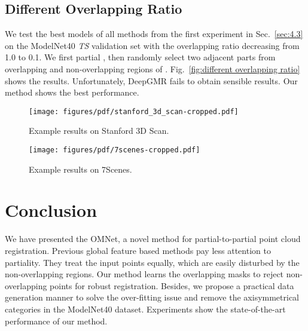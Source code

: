 \documentclass[10pt,twocolumn,letterpaper]{article}
\begin{document}
\subsection{Different Overlapping Ratio}
We test the best models of all methods from the first experiment in Sec.~\ref{sec:4.3} on the ModelNet40 \emph{TS} validation set with the overlapping ratio decreasing from 1.0 to 0.1. We first partial , then randomly select two adjacent parts from overlapping and non-overlapping regions of . Fig.~\ref{fig:different overlapping ratio} shows the results. Unfortunately, DeepGMR fails to obtain sensible results. Our method shows the best performance.

\begin{figure}[t]
    \centering
    \texttt{[image: figures/pdf/stanford\_3d\_scan-cropped.pdf]}\\
    \caption{Example results on Stanford 3D Scan.}
    \vspace{-0.35cm}
    \label{fig:stanford 3d scan}
\end{figure} \begin{figure}[t]
    \centering
    \texttt{[image: figures/pdf/7scenes-cropped.pdf]}\\
    \caption{Example results on 7Scenes.}
    \vspace{-0.40cm}
    \label{fig:7scenes}
\end{figure} %
 
\section{Conclusion}
We have presented the OMNet, a novel method for partial-to-partial point cloud registration. Previous global feature based methods pay less attention to partiality. They treat the input points equally, which are easily disturbed by the non-overlapping regions. Our method learns the overlapping masks to reject non-overlapping points for robust registration. Besides, we propose a practical data generation manner to solve the over-fitting issue and remove the axisymmetrical categories in the ModelNet40 dataset. Experiments show the state-of-the-art performance of our method.
\vspace{-0.9cm}
\end{document}
